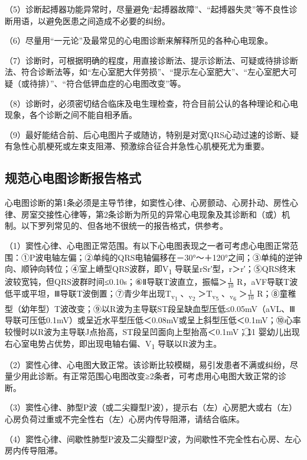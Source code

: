 （5）诊断起搏器功能异常时，尽量避免“起搏器故障”、“起搏器失灵”等不良性诊断用语，以避免医患之间造成不必要的纠纷。

（6）尽量用“一元论”及最常见的心电图诊断来解释所见的各种心电现象。

（7）诊断时，可根据明确的程度，用直接诊断法、提示诊断法、可疑或待排诊断法、符合诊断法等，如“左心室肥大伴劳损”、“提示左心室肥大”、“左心室肥大可疑（或待排）”、“符合低钾血症的心电图改变”等。

（8）诊断时，必须密切结合临床及电生理检查，符合目前公认的各种理论和心电现象，各个诊断之间不能自相矛盾。

（9）最好能结合前、后心电图片子或随访，特别是对宽QRS心动过速的诊断、疑有急性心肌梗死或左束支阻滞、预激综合征合并急性心肌梗死尤为重要。

\protect\hypertarget{text00057.htmlux5cux23subid678}{}{}

\subsection{规范心电图诊断报告格式}

心电图诊断的第1条必须是主导节律，如窦性心律、心房颤动、心房扑动、房性心律、房室交接性心律等，第2条诊断为所见的异常心电现象及其诊断和（或）机制。以下罗列常见的、但各地不很统一的报告格式，供参考。

（1）窦性心律、心电图正常范围。有以下心电图表现之一者可考虑心电图正常范围：①P波电轴左偏；②单纯的QRS电轴偏移在－30°～＋120°之间；③单纯的逆钟向、顺钟向转位；④室上嵴型QRS波群，即V\textsubscript{1}
导联呈rSr′型，r＞r′；⑤QRS终末波较宽钝，但QRS波群时间≤0.10s；⑥Ⅱ导联T波直立，振幅＞$\frac{1}{10}$
R，aVF导联T波低平或平坦，Ⅲ导联T波倒置；⑦青少年出现T\textsubscript{v\textsubscript{1}}
、\textsubscript{v\textsubscript{2}}
＞T\textsubscript{v\textsubscript{5}}
、\textsubscript{v\textsubscript{6}}
＞$\frac{1}{10}$
R；⑧童稚型（幼年型）T波改变；⑨以R波为主导联ST段呈缺血型压低≤0.05mV（aVL、Ⅲ导联可压低0.1mV）或呈近水平型压低＜0.08mV或呈上斜型压低＜0.1mV；⑩心率较慢时以R波为主导联J点抬高，ST段呈凹面向上型抬高＜0.1mV；\textcircled{11}
婴幼儿出现右心室电势占优势，即出现电轴右偏、V\textsubscript{1}
导联以R波为主。

（2）窦性心律、心电图大致正常。该诊断比较模糊，易引发患者不满或纠纷，尽量少用此诊断。有正常范围心电图改变≥2条者，可考虑用心电图大致正常的诊断。

（3）窦性心律、肺型P波（或二尖瓣型P波），提示右（左）心房肥大或右（左）心房负荷过重或不完全性右（左）心房内传导阻滞，请结合临床。

（4）窦性心律、间歇性肺型P波及二尖瓣型P波，为间歇性不完全性右心房、左心房内传导阻滞。

